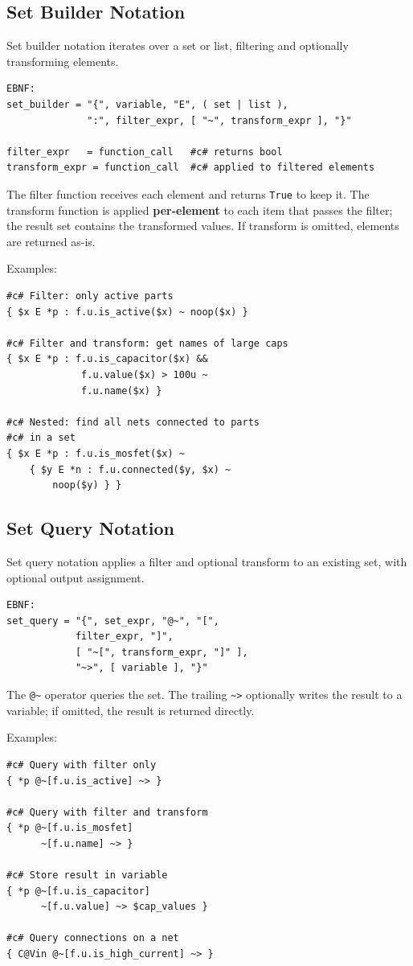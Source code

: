 \subsection{Set Builder Notation}
Set builder notation iterates over a set or list, filtering and optionally transforming elements.
\begin{verbatim}
EBNF:
set_builder = "{", variable, "E", ( set | list ), 
              ":", filter_expr, [ "~", transform_expr ], "}"

filter_expr   = function_call   #c# returns bool
transform_expr = function_call  #c# applied to filtered elements
\end{verbatim}

The filter function receives each element and returns \texttt{True} to keep it. The transform function is applied \textbf{per-element} to each item that passes the filter; the result set contains the transformed values. If transform is omitted, elements are returned as-is.

Examples:
\begin{verbatim}
#c# Filter: only active parts
{ $x E *p : f.u.is_active($x) ~ noop($x) }

#c# Filter and transform: get names of large caps
{ $x E *p : f.u.is_capacitor($x) && 
             f.u.value($x) > 100u ~ 
             f.u.name($x) }

#c# Nested: find all nets connected to parts 
#c# in a set
{ $x E *p : f.u.is_mosfet($x) ~ 
    { $y E *n : f.u.connected($y, $x) ~ 
        noop($y) } }
\end{verbatim}

\subsection{Set Query Notation}
Set query notation applies a filter and optional transform to an existing set, with optional output assignment.
\begin{verbatim}
EBNF:
set_query = "{", set_expr, "@~", "[", 
            filter_expr, "]", 
            [ "~[", transform_expr, "]" ],
            "~>", [ variable ], "}"
\end{verbatim}

The \texttt{@\~} operator queries the set. The trailing \texttt{\~{}>} optionally writes the result to a variable; if omitted, the result is returned directly.

Examples:
\begin{verbatim}
#c# Query with filter only
{ *p @~[f.u.is_active] ~> }

#c# Query with filter and transform
{ *p @~[f.u.is_mosfet] 
      ~[f.u.name] ~> }

#c# Store result in variable
{ *p @~[f.u.is_capacitor] 
      ~[f.u.value] ~> $cap_values }

#c# Query connections on a net
{ C@Vin @~[f.u.is_high_current] ~> }
\end{verbatim}


